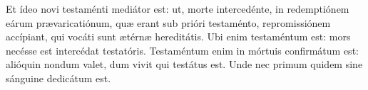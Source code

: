 Et ídeo novi testaménti mediátor est:
	ut, morte intercedénte, in redemptiónem eárum prævaricatiónum,
	quæ erant sub prióri testaménto, repromissiónem accípiant,
	qui vocáti sunt ætérnæ hereditátis.
Ubi enim testaméntum est: mors necésse est intercédat testatóris.
Testaméntum enim in mórtuis confirmátum est: alióquin nondum valet,
	dum vivit qui testátus est.
Unde nec primum quidem sine sánguine dedicátum est.
